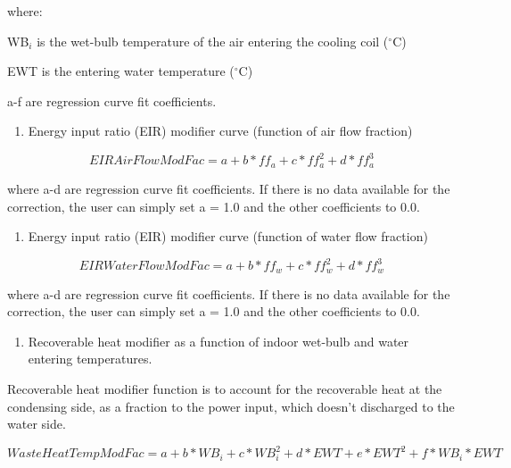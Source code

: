 where:

WB\(_{i}\) is the wet-bulb temperature of the air entering the cooling coil (\(^{\circ}\)C)

EWT is the entering water temperature (\(^{\circ}\)C)

a-f are regression curve fit coefficients.

\begin{enumerate}
\def\labelenumi{\arabic{enumi})}
\setcounter{enumi}{4}
\tightlist
\item
  Energy input ratio (EIR) modifier curve (function of air flow fraction)
\end{enumerate}

\begin{equation}
EIRAirFlowModFac = a + b*f{f_a} + c*ff_a^2 + d*ff_a^3
\end{equation}

where a-d are regression curve fit coefficients.  If there is no data available for the correction, the user can simply set a = 1.0 and the other coefficients to 0.0.

\begin{enumerate}
\def\labelenumi{\arabic{enumi})}
\setcounter{enumi}{5}
\tightlist
\item
  Energy input ratio (EIR) modifier curve (function of water flow fraction)
\end{enumerate}

\begin{equation}
EIRWaterFlowModFac = a + b*f{f_w} + c*ff_w^2 + d*ff_w^3
\end{equation}

where a-d are regression curve fit coefficients.  If there is no data available for the correction, the user can simply set a = 1.0 and the other coefficients to 0.0.

\begin{enumerate}
\def\labelenumi{\arabic{enumi})}
\setcounter{enumi}{6}
\tightlist
\item
  Recoverable heat modifier as a function of indoor wet-bulb and water entering temperatures.
\end{enumerate}

Recoverable heat modifier function is to account for the recoverable heat at the condensing side, as a fraction to the power input, which doesn't discharged to the water side.

\begin{equation}
WasteHeatTempModFac = a + b*W{B_i} + c*WB_i^2 + d*EWT + e*EW{T^2} + f*W{B_i}*EWT
\end{equation}

